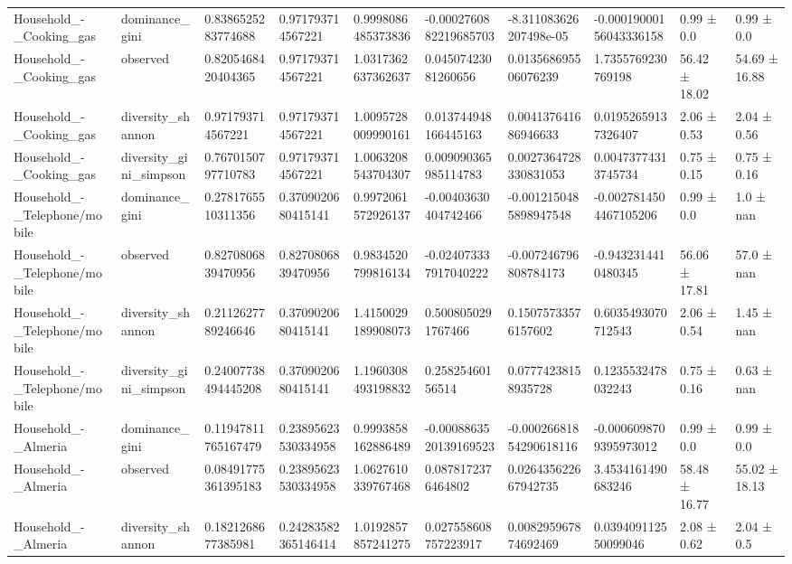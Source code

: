 \begin{longtable}{llllllllll}
Household\_-\_Cooking\_gas & dominance\_gini & 0.8386525283774688 & 0.971793714567221 & 0.9998086485373836 & -0.0002760882219685703 & -8.311083626207498e-05 & -0.00019000156043336158 & 0.99 ± 0.0 & 0.99 ± 0.0 \\
Household\_-\_Cooking\_gas & observed & 0.8205468420404365 & 0.971793714567221 & 1.0317362637362637 & 0.04507423081260656 & 0.013568695506076239 & 1.7355769230769198 & 56.42 ± 18.02 & 54.69 ± 16.88 \\
Household\_-\_Cooking\_gas & diversity\_shannon & 0.971793714567221 & 0.971793714567221 & 1.0095728009990161 & 0.013744948166445163 & 0.004137641686946633 & 0.01952659137326407 & 2.06 ± 0.53 & 2.04 ± 0.56 \\
Household\_-\_Cooking\_gas & diversity\_gini\_simpson & 0.7670150797710783 & 0.971793714567221 & 1.0063208543704307 & 0.009090365985114783 & 0.0027364728330831053 & 0.00473774313745734 & 0.75 ± 0.15 & 0.75 ± 0.16 \\
Household\_-\_Telephone/mobile & dominance\_gini & 0.2781765510311356 & 0.3709020680415141 & 0.9972061572926137 & -0.00403630404742466 & -0.0012150485898947548 & -0.0027814504467105206 & 0.99 ± 0.0 & 1.0 ± nan \\
Household\_-\_Telephone/mobile & observed & 0.8270806839470956 & 0.8270806839470956 & 0.9834520799816134 & -0.024073337917040222 & -0.007246796808784173 & -0.9432314410480345 & 56.06 ± 17.81 & 57.0 ± nan \\
Household\_-\_Telephone/mobile & diversity\_shannon & 0.2112627789246646 & 0.3709020680415141 & 1.4150029189908073 & 0.5008050291767466 & 0.15075733576157602 & 0.6035493070712543 & 2.06 ± 0.54 & 1.45 ± nan \\
Household\_-\_Telephone/mobile & diversity\_gini\_simpson & 0.24007738494445208 & 0.3709020680415141 & 1.1960308493198832 & 0.25825460156514 & 0.07774238158935728 & 0.1235532478032243 & 0.75 ± 0.16 & 0.63 ± nan \\
Household\_-\_Almeria & dominance\_gini & 0.11947811765167479 & 0.23895623530334958 & 0.9993858162886489 & -0.0008863520139169523 & -0.00026681854290618116 & -0.0006098709395973012 & 0.99 ± 0.0 & 0.99 ± 0.0 \\
Household\_-\_Almeria & observed & 0.08491775361395183 & 0.23895623530334958 & 1.0627610339767468 & 0.0878172376464802 & 0.026435622667942735 & 3.4534161490683246 & 58.48 ± 16.77 & 55.02 ± 18.13 \\
Household\_-\_Almeria & diversity\_shannon & 0.1821268677385981 & 0.24283582365146414 & 1.0192857857241275 & 0.027558608757223917 & 0.008295967874692469 & 0.039409112550099046 & 2.08 ± 0.62 & 2.04 ± 0.5 \\

\end{longtable}
